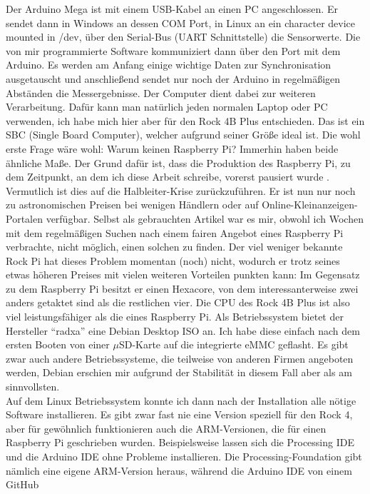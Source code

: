\documentclass[10pt]{article}
\begin{document}
Der Arduino Mega ist mit einem USB-Kabel an einen PC angeschlossen. Er sendet dann in Windows an dessen COM Port, in Linux an ein character device mounted in /dev,
über den Serial-Bus (UART Schnittstelle) die Sensorwerte. Die von mir programmierte Software kommuniziert dann
über den Port mit dem Arduino. Es werden am Anfang einige wichtige Daten zur Synchronisation ausgetauscht und anschließend sendet nur noch der Arduino
in regelmäßigen Abständen die Messergebnisse. Der Computer dient dabei zur weiteren Verarbeitung. Dafür kann man natürlich jeden normalen Laptop oder PC
verwenden, ich habe mich hier aber für den Rock 4B Plus \autocite{Rock4} entschieden. Das ist ein SBC (Single Board Computer), welcher aufgrund seiner Größe ideal ist.
Die wohl erste Frage wäre wohl: Warum keinen Raspberry Pi? Immerhin haben beide ähnliche Maße. Der Grund dafür ist,
dass die Produktion des Raspberry Pi, zu dem Zeitpunkt, an dem ich diese Arbeit schreibe, vorerst pausiert wurde \autocite{RaspberrySupply}. Vermutlich ist dies auf
die Halbleiter-Krise zurückzuführen. Er ist nun nur noch zu astronomischen Preisen bei wenigen Händlern oder auf Online-Kleinanzeigen-Portalen verfügbar. Selbst 
als gebrauchten Artikel war es mir, obwohl ich Wochen mit dem regelmäßigen Suchen nach einem fairen Angebot eines Raspberry Pi verbrachte, nicht möglich,
einen solchen zu finden.
Der viel weniger bekannte Rock Pi hat dieses Problem momentan (noch) nicht, wodurch er trotz seines etwas höheren Preises
mit vielen weiteren Vorteilen punkten kann: Im Gegensatz zu dem Raspberry Pi besitzt er einen Hexacore, von dem interessanterweise zwei anders getaktet sind
als die restlichen vier. Die CPU des Rock 4B Plus ist also viel leistungsfähiger als die eines Raspberry Pi. Als Betriebssystem bietet der Hersteller "`radxa"'
eine Debian Desktop ISO an. Ich habe diese einfach nach dem ersten Booten von einer $\mu$SD-Karte auf
die integrierte eMMC geflasht. Es gibt zwar auch andere Betriebssysteme, die teilweise von anderen Firmen angeboten werden, Debian erschien mir aufgrund der Stabilität
in diesem Fall aber als am sinnvollsten.\\
Auf dem Linux Betriebssystem konnte ich dann nach der Installation alle nötige Software installieren. Es gibt zwar fast nie eine Version speziell für den Rock 4, aber
für gewöhnlich funktionieren auch die ARM-Versionen, die für einen Raspberry Pi geschrieben wurden. Beispielsweise lassen sich die Processing IDE und die Arduino IDE 
ohne Probleme installieren. Die Processing-Foundation gibt nämlich eine eigene ARM-Version heraus, während die Arduino IDE von einem GitHub 
\end{document}
